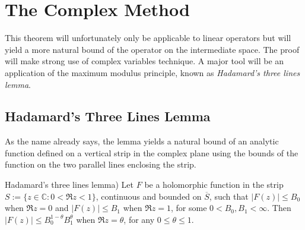 \section{The Complex Method}
This theorem will unfortunately only be applicable to linear operators but will yield a more natural bound of the operator on the intermediate space. The proof will make strong use of complex variables technique. A major tool will be an application of the maximum modulus principle, known as \emph{Hadamard's three lines lemma}.

\subsection{Hadamard's Three Lines Lemma}
As the name already says, the lemma yields a natural bound of an analytic function defined on a vertical strip in the complex plane using the bounds of the function on the two parallel lines enclosing the strip.

\vspace{2mm}

\begin{mdframed}
	\begin{lemma}{Hadamard's three lines lemma)}
		Let $F$ be a holomorphic function in the strip $S := \{z \in \mathbb{C}: 0 < \Re z < 1\}$, continuous and bounded on $\overline{S}$, such that $\left| F(z)\right| \leqslant B_0$ when $\Re z = 0$ and $\left| F(z) \right| \leqslant B_1$ when $\Re z = 1$, for some $0 < B_0,B_1 < \infty$. Then $\left| F(z) \right| \leqslant B_0^{1 - \theta}B_1^\theta$ when $\Re z = \theta$, for any $0 \leqslant \theta \leqslant 1$.
		\label{lem:HTL}
	\end{lemma}
\end{mdframed}
				
\vspace{2mm}

